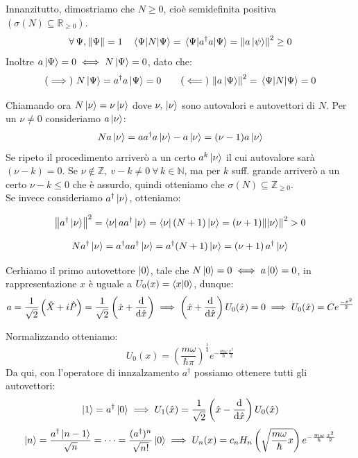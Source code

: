 Innanzitutto, dimostriamo che \(N \geq 0 \), cioè semidefinita positiva \((\sigma(N)\subseteq \mathbb{R}_{\geq0})\).
\[
    \forall \,\Psi , \norm{\Psi} = 1 \quad \expval{N}{\Psi} = \expval{a^\dagger a}{\Psi} = \norm{a\ket{\psi}}^2 \geq0
\]
Inoltre \(a\ket{\Psi}= 0 \iff N\ket{\Psi}= 0\), dato che:
\[
   (\implies) \ N\ket{\Psi} = a^\dagger a \ket{\Psi} = 0 \qquad (\impliedby)\  \norm{a\ket{\Psi}}^2 = \expval{N}{\Psi} = 0
\]

Chiamando ora \(N\ket{\nu}= \nu \ket{\nu}\) dove \(\nu, \,\ket{\nu}\) sono autovalori e autovettori di \(N\). 
Per un \(\nu \neq 0 \) consideriamo \(a\ket{\nu}\):
\begin{equation}
    Na\ket{\nu}= a a^\dagger a \ket{\nu}- a\ket{\nu} = (\nu-1)a\ket{\nu}
\end{equation}
Se ripeto il procedimento arriverò a un certo \(a^k\ket{\nu}\) il cui autovalore sarà \((\nu-k)=0\).
Se \(\nu \notin \mathbb{Z}, \ v-k \neq 0 \ \forall \,k \in \mathbb{N}\), ma per \(k\) suff. grande arriverò a un certo \(\nu-k\leq0\) che è assurdo,
quindi otteniamo che \(\sigma(N)\subseteq \mathbb{Z}_{\geq0}\).\\
Se invece consideriamo \(a^\dagger\ket{\nu}\), otteniamo:

\[
\norm{a^\dagger\ket{\nu}}^2 
= \bra{\nu} a a^\dagger \ket{\nu}
= \bra{\nu} (N + 1) \ket{\nu}
= (\nu + 1)\norm{\ket{\nu}}^2 > 0
\]

\[
N a^\dagger \ket{\nu}
= a^\dagger a a^\dagger \ket{\nu}
= a^\dagger (N + 1)\ket{\nu}
= (\nu + 1)\, a^\dagger \ket{\nu}
\]

Cerhiamo il primo autovettore \(\ket{0}\), tale che \(N\ket{0}=0 \iff a \ket{0}=0\), in rappresentazione \(x\) è uguale a \(U_0(x)= \braket{x}{0}\), dunque:
\[
    a= \frac{1}{\sqrt{2}}\left( \hat{X}+ i\hat{P} \right)   = \frac{1}{\sqrt{2}}\left( \hat{x}+ \dv{\hat{x}} \right) \implies \left( \hat{x}+ \dv{\hat{x}} \right)U_0(\hat{x})= 0 \implies U_0(\hat{x})= C e^{\frac{-\hat{x}^2}{2}}
\]

Normalizzando otteniamo:
\[
    U_0(x)= \left(  \frac{m\omega}{\hbar\pi }\right)^{\frac{1}{4}}e ^{-\frac{m\omega}{\hbar}\frac{x^2}{2}}    
\]
Da qui, con l'operatore di innzalzamento \(a^\dagger\) possiamo ottenere tutti gli autovettori:
\[
    \ket{1} = a^\dagger \ket{0}  \implies U_1(\hat{x})= \frac{1}{\sqrt{2}}\left( \hat{x}- \dv{\hat{x}} \right) U_0(\hat{x})
\]
\begin{equation}
    \ket{n} = \frac{a^\dagger\ket{n-1}}{\sqrt{n}} = \dots = \frac{(a^\dagger)^n}{\sqrt{n!}}\ket{0}  \implies U_n(x) = c_n H_n\left(\sqrt{\frac{m\omega}{\hbar}x}\right)e^{-\frac{m \omega}{\hbar}\frac{x^2}{2}}
\end{equation}

